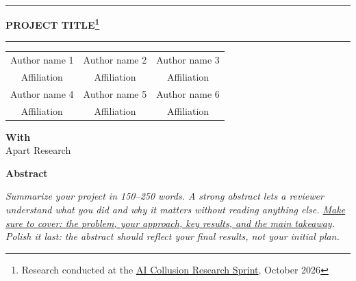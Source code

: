 \documentclass[10pt]{article}
\newif\ifshowguidance
\newcommand{\guidancebox}[1]{\ifshowguidance
  \begin{tcolorbox}[colback=guidancefill,colframe=black,boxrule=0.5pt,arc=0pt,
    left=6pt,right=6pt,top=4pt,bottom=4pt,fontupper=\sffamily\small]#1\end{tcolorbox}\fi}
\newcommand{\projecttitle}{PROJECT TITLE}
\newcommand{\sprintfootnote}{Research conducted at the
  \href{https://apartresearch.com/sprints/ai-collusion-research-sprint-2026-10-23-to-2026-10-25}{AI Collusion Research Sprint}, October 2026}
\begin{document}
\thispagestyle{plain}

\noindent\rule{\linewidth}{3pt}
\vspace{6pt}
\begin{center}
  {\fontsize{20}{24}\selectfont\bfseries \projecttitle\footnote{\sprintfootnote}\par}
\end{center}
\vspace{2pt}
\noindent\rule{\linewidth}{0.8pt}

\vspace{8pt}
\begin{center}
\begin{tabular}{ccc}
  Author name 1 & Author name 2 & Author name 3 \\
  Affiliation   & Affiliation   & Affiliation   \\[8pt]
  Author name 4 & Author name 5 & Author name 6 \\
  Affiliation   & Affiliation   & Affiliation   \\
\end{tabular}

\vspace{8pt}
\textbf{With}\\
Apart Research
\end{center}

\begin{center}
  {\fontsize{14}{17}\selectfont\bfseries Abstract}
\end{center}
\begin{list}{}{\leftmargin=0.75in\rightmargin=0.75in}\item[]
\itshape
Summarize your project in 150--250 words. A strong abstract lets a reviewer understand
what you did and why it matters without reading anything else.
\uline{Make sure to cover: the problem, your approach, key results, and the main takeaway}.
Polish it last: the abstract should reflect your final results, not your initial plan.
\end{list}

\clearpage

\guidancebox{%
\textbf{How to use this template}: Replace the \textit{italicized guidance text} under each
section with your content. The section structure is strong guidance but not rigid. If your
project requires a different organization, feel free to adapt.
\uline{Delete all guidance text including this info box before submitting}. Make sure the
project title and author information above are up to date.

\medskip
\textbf{How your submission will be evaluated}: Your project will be judged on the quality of
this written report. To understand what we look for, see our
\href{https://apartresearch.notion.site/sprint-evaluation-rubric}{Evaluation Rubric}.

\medskip
\textbf{Recommended length}: 4 pages excluding references and appendix.\\
Rough guide: Intro \& Related Work 1p, Methods and Results: 2.5p, Discussion 0.5p.
}
\end{document}

